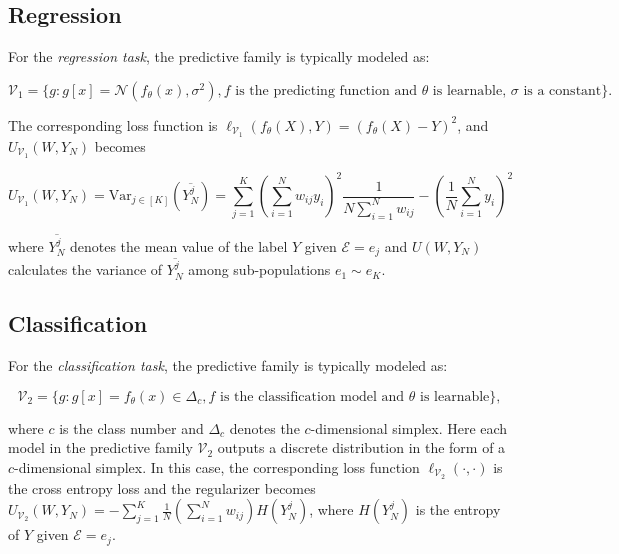 \subsection{Regression}
For the \emph{regression task}, the predictive family is typically modeled as:
\begin{small}
\begin{equation}
	\mathcal{V}_1 = \{g: g[x]=\mathcal{N}(f_{\theta}(x), \sigma^2), f\text{ is the predicting function and }\theta\text{ is learnable, }\sigma \text{ is a constant}\}.
\end{equation}	
\end{small}
The corresponding loss function is $\ell_{\mathcal{V}_1}(f_\theta(X),Y)=(f_\theta(X)-Y)^2$, and $U_{\mathcal{V}_1}(W,Y_N)$ becomes 
\begin{small}
\begin{equation}
\label{equ:regularizer-regression}
	U_{\mathcal{V}_1}(W,Y_N) = \text{Var}_{j\in [K]}(\overline{Y_N^j})= \sum_{j=1}^K\left(\sum_{i=1}^N w_{ij}y_i\right)^2\frac{1}{N\sum_{i=1}^Nw_{ij}}-\left(\frac{1}{N}\sum_{i=1}^Ny_i\right)^2
\end{equation}	
\end{small}
where $\overline{Y^j_N}$ denotes the mean value of the label $Y$ given $\mathcal{E}=e_j$ and $U(W,Y_N)$ calculates the variance of $\overline{Y^j_N}$ among sub-populations $e_1\sim e_K$.


\subsection{Classification}
For the \emph{classification task}, the predictive family is typically modeled as:
\begin{small}
\begin{equation}
	\mathcal{V}_2 = \{g: g[x]=f_\theta(x)\in\Delta_c, f\text{ is the classification model and }\theta\text{ is learnable}\},
\end{equation}	
\end{small}
where $c$ is the class number and $\Delta_c$ denotes the $c$-dimensional simplex.
Here each model in the predictive family $\mathcal V_2$ outputs a discrete distribution in the form of a $c$-dimensional simplex.
In this case, the corresponding loss function $\ell_{\mathcal V_2}(\cdot,\cdot)$ is the cross entropy loss and the regularizer becomes $U_{\mathcal V_2}(W,Y_N) = -\sum_{j=1}^K \frac{1}{N}(\sum_{i=1}^Nw_{ij}) H(Y_N^j)$, where $H(Y_N^j)$ is the entropy of $Y$ given $\mathcal{E}=e_j$.

